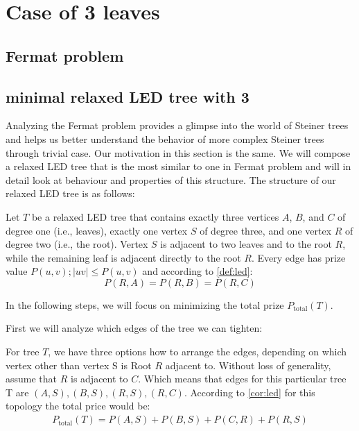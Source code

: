\documentclass[12pt]{article}
\newcommand{\Price}[2]{P(#1,#2)}
\newcommand{\Ptotal}[1]{P_{\text{total}}(#1)}
\begin{document}
	\section*{Case of 3 leaves}
	
	
	 
	\subsection{Fermat problem}
	
	
	
	\subsection{minimal relaxed LED tree with 3}
	
	Analyzing the Fermat problem provides a glimpse into the world of Steiner trees and helps us better understand the behavior of more complex Steiner trees through trivial case. Our motivation in this section is the same. We will compose a relaxed LED tree that is the most similar to one in Fermat problem and will in detail look at behaviour and properties of this structure. The structure of our relaxed LED tree is as follows:
	
	Let \( T \) be a relaxed LED tree that contains exactly three vertices \( A \), \( B \), and \( C \) of degree one (i.e., leaves), exactly one vertex \( S \) of degree three, and one vertex \( R \) of degree two (i.e., the root). Vertex \( S \) is adjacent to two leaves and to the root \( R \), while the remaining leaf is adjacent directly to the root \( R \). Every edge has prize value \(\Price{u}{v}; |uv| \leq \Price{u}{v} \) and according to \cref{def:led}: 
	\[
	\Price{R}{A} = \Price{R}{B} = \Price{R}{C}
	\] 
	
	In the following steps, we will focus on minimizing the total prize \(\Ptotal{T}\).
	
	First we will analyze which edges of the tree we can tighten:
	
	For tree \( T \), we have three options how to arrange the edges, depending on which vertex other than vertex S is Root \( R \) adjacent to. Without loss of generality, assume that \(R\) is adjacent to \(C\). Which means that edges for this particular tree T are \((A,S),(B,S),(R,S),(R,C)\). According to  \cref{cor:led} for this topology the total price would be:
	 \begin{align*}
	 	\Ptotal{T} = \Price{A}{S} + \Price{B}{S} + \Price{C}{R} + \Price{R}{S}
	 \end{align*}
	 
\end{document}
